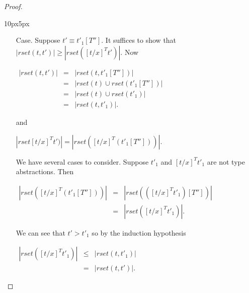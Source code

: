 \begin{proof}
\begin{changemargin}{10px}{5px}
\begin{itemize}
\item[Case.] Suppose $t' \equiv t'_1[T'']$.  It suffices to show that 
  $|rset(t,t')| \geq |rset([t/x]^T t')|$.  Now 
  \begin{center}
    \begin{math}
      \begin{array}{lll}
        |rset(t,t')| & = & |rset(t,t'_1[T''])|\\
        & = & |rset(t) \cup rset(t'_1[T''])|\\
        & = & |rset(t) \cup rset(t'_1)|\\
        & = & |rset(t,t'_1)|.
      \end{array}
    \end{math}
  \end{center}
  and
  \begin{center}
    $|rset[t/x]^T t')| = |rset([t/x]^T(t'_1[T'']))|$.
  \end{center}
  We have several cases to consider.  Suppose $t'_1$ and $[t/x]^T t'_1$ are not type abstractions.
  Then 
  \begin{center}
    \begin{math}
      \begin{array}{lll}
        |rset([t/x]^T(t'_1[T'']))| & = & |rset(([t/x]^T t'_1)[T''])|\\
        & = & |rset([t/x]^T t'_1)|.
      \end{array}
    \end{math}
  \end{center}
  We can see that $t' > t'_1$ so by the induction hypothesis 
  \begin{center}
    \begin{math}
      \begin{array}{lll}
        |rset([t/x]^T t'_1)| & \leq & |rset(t,t'_1)|\\
        & = & |rset(t,t')|.
      \end{array}
    \end{math}
  \end{center}
  

\end{itemize}
\end{changemargin}
\end{proof}

